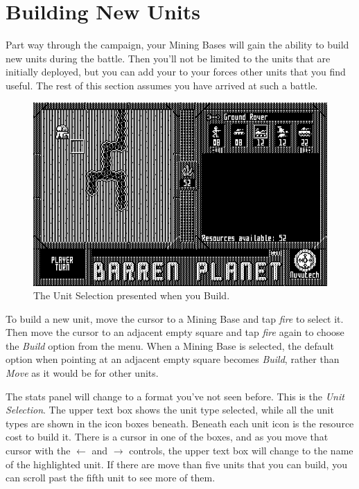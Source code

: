 \section{Building New Units}

\noindent
Part way through the campaign, your Mining Bases will gain the ability to build new units during the battle. Then you'll not be limited to the units that are initially deployed, but you can add your to your forces other units that you find useful. The rest of this section assumes you have arrived at such a battle.

\begin{figure}[h]
  \includegraphics[width=\textwidth]{unit-build}
  \caption{The Unit Selection presented when you Build.}
\end{figure}

To build a new unit, move the cursor to a Mining Base and tap {\it fire} to select it. Then move the cursor to an adjacent empty square and tap {\it fire} again to choose the {\it Build} option from the menu. When a Mining Base is selected, the default option when pointing at an adjacent empty square becomes {\it Build}, rather than {\it Move} as it would be for other units.

The stats panel will change to a format you've not seen before. This is the {\it Unit Selection}. The upper text box shows the unit type selected, while all the unit types are shown in the icon boxes beneath. Beneath each unit icon is the resource cost to build it. There is a cursor in one of the boxes, and as you move that cursor with the $\leftarrow$ and $\rightarrow$ controls, the upper text box will change to the name of the highlighted unit. If there are move than five units that you can build, you can scroll past the fifth unit to see more of them.

